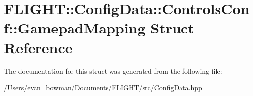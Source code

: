 \hypertarget{struct_f_l_i_g_h_t_1_1_config_data_1_1_controls_conf_1_1_gamepad_mapping}{}\section{F\+L\+I\+G\+HT\+:\+:Config\+Data\+:\+:Controls\+Conf\+:\+:Gamepad\+Mapping Struct Reference}
\label{struct_f_l_i_g_h_t_1_1_config_data_1_1_controls_conf_1_1_gamepad_mapping}


The documentation for this struct was generated from the following file\+:\begin{DoxyCompactItemize}
\item 
/\+Users/evan\+\_\+bowman/\+Documents/\+F\+L\+I\+G\+H\+T/src/Config\+Data.\+hpp\end{DoxyCompactItemize}
